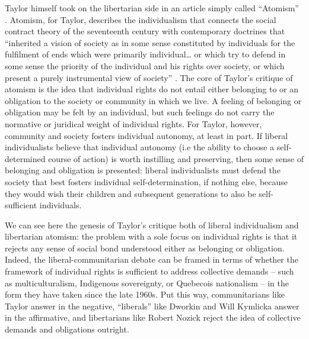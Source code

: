 \documentclass[12pt,oneside]{memoir}
\begin{document}
	Taylor himself took on the libertarian side in an article simply called ``Atomism'' \citep{Taylor1985}. Atomism, for Taylor, describes the individualism that connects the social contract theory of the seventeenth century with contemporary doctrines that ``inherited a vision of society as in some sense constituted by individuals for the fulfilment of ends which were primarily individual{\ldots} or which try to defend in some sense the priority of the individual and his rights over society, or which present a purely instrumental view of society'' \citep[187]{Taylor1985}. The core of Taylor's critique of atomism is the idea that individual rights do not entail either belonging to or an obligation to the society or community in which we live. A feeling of belonging or obligation may be felt by an individual, but such feelings do not carry the normative or juridical weight of individual rights. For Taylor, however, community and society fosters individual autonomy, at least in part. If liberal individualists believe that individual autonomy (i.e the ability to choose a self-determined course of action) is worth instilling and preserving, then some sense of belonging and obligation is presented: liberal individualists must defend the society that best fosters individual self-determination, if nothing else, because they would wish their children and subsequent generations to also be self-sufficient individuals.
	
We can see here the genesis of Taylor's critique both of liberal individualism and libertarian atomism: the problem with a sole focus on individual rights is that it rejects any sense of social bond understood either as belonging or obligation. Indeed, the liberal-communitarian debate can be framed in terms of whether the framework of individual rights is sufficient to address collective demands -- such as multiculturalism, Indigenous sovereignty, or Quebecois nationalism -- in the form they have taken since the late 1960s. Put this way, communitarians like Taylor answer in the negative, ``liberals'' like Dworkin and Will Kymlicka answer in the affirmative, and libertarians like Robert Nozick reject the idea of collective demands and obligations outright.
\end{document}
